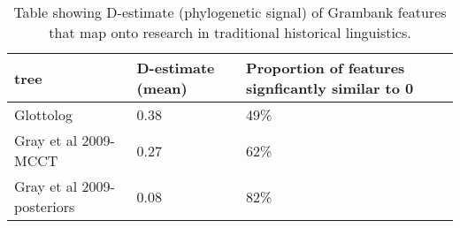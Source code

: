 \begin{table}[ht]
\centering
\begin{tabular}{lll}
  \hline
tree & D-estimate (mean) & Proportion of features signficantly similar to 0 \\ 
  \hline
Glottolog & 0.38 & 49\% \\ 
  Gray et al 2009-MCCT & 0.27 & 62\% \\ 
  Gray et al 2009-posteriors & 0.08 & 82\% \\ 
   \hline
\end{tabular}
\caption{Table showing D-estimate (phylogenetic signal) of Grambank features that map onto research in traditional historical linguistics.} 
\label{d_estimate_summary}
\end{table}
